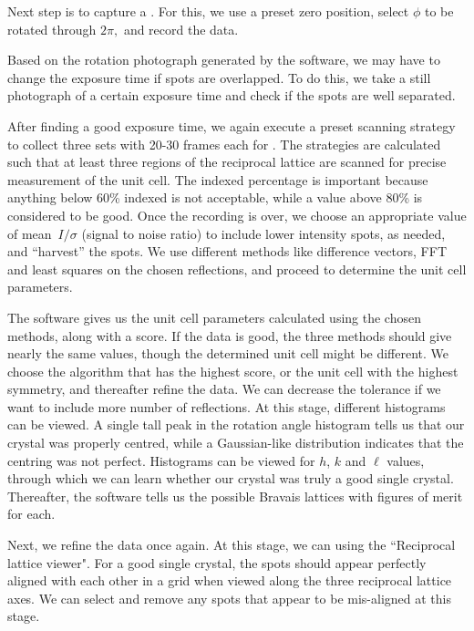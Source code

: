 Next step is to capture a . For this, we use a preset zero position, select $\phi$ to be rotated through $2\pi,$ and record the data.

Based on the rotation photograph generated by the software, we may have to change the exposure time if spots are overlapped. To do this, we take a still photograph of a certain exposure time and check if the spots are well separated.

After finding a good exposure time, we again execute a preset scanning strategy to collect three sets with 20-30 frames each for . The strategies are calculated such that at least three regions of the reciprocal lattice are scanned for precise measurement of the unit cell. The indexed percentage is important because anything below 60\% indexed is not acceptable, while a value above 80\% is considered to be good. Once the recording is over, we choose an appropriate value of mean~$I/\sigma$ (signal to noise ratio) to include lower intensity spots, as needed, and ``harvest'' the spots. We use different methods like difference vectors, FFT and least squares on the chosen reflections, and proceed to determine the unit cell parameters.

The software gives us the unit cell parameters calculated using the chosen methods, along with a score. If the data is good, the three methods should give nearly the same values, though the determined unit cell might be different. We choose the algorithm that has the highest score, or the unit cell with the highest symmetry, and thereafter refine the data. We can decrease the tolerance if we want to include more number of reflections. At this stage, different histograms can be viewed. A single tall peak in the rotation angle histogram tells us that our crystal was properly centred, while a Gaussian-like distribution indicates that the centring was not perfect. Histograms can be viewed for $h$, $k$ and $\ell$ values, through which we can learn whether our crystal was truly a good single crystal. Thereafter, the software tells us the possible Bravais lattices with figures of merit for each.

Next, we refine the data once again. At this stage, we can  using the ``Reciprocal lattice viewer". For a good single crystal, the spots should appear perfectly aligned with each other in a grid when viewed along the three reciprocal lattice axes. We can select and remove any spots that appear to be mis-aligned at this stage.

